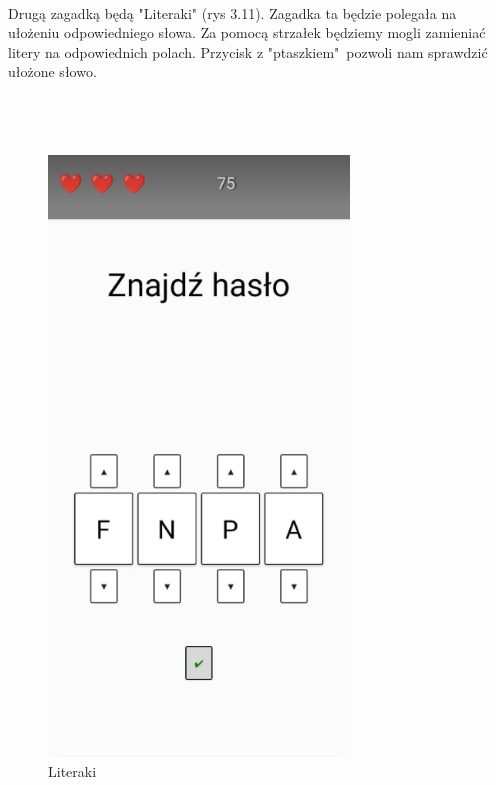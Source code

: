\\
Drugą zagadką będą "Literaki" (rys 3.11). Zagadka ta będzie polegała na ułożeniu odpowiedniego słowa. Za pomocą strzałek będziemy mogli zamieniać litery na odpowiednich polach. Przycisk z "ptaszkiem"~pozwoli nam sprawdzić ułożone słowo. 
\\
\\
\\
\\
	\begin{figure}[!htb]
	\begin{center}
		\includegraphics[width=8cm]{rys/gra88.png}
		\caption{Literaki}
		\label{rys:rysunek001}
	\end{center}
\end{figure}

